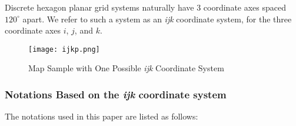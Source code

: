 \documentclass[13pt]{ctexart} %
\begin{document}
Discrete hexagon planar grid systems naturally have $3$ coordinate axes spaced $120^{\circ}$ apart. We refer to such a system as an \textit{ijk} coordinate system, for the three coordinate axes $i$, $j$, and $k$.

\begin {figure}[h]
\centering %
\texttt{[image: ijkp.png]}
\caption{Map Sample with One Possible \textit{ijk} Coordinate System} %
\end {figure}

\newpage
\subsubsection{Notations Based on the \textit{ijk} coordinate system}
The notations used in this paper are listed as follows:
\end{document}
